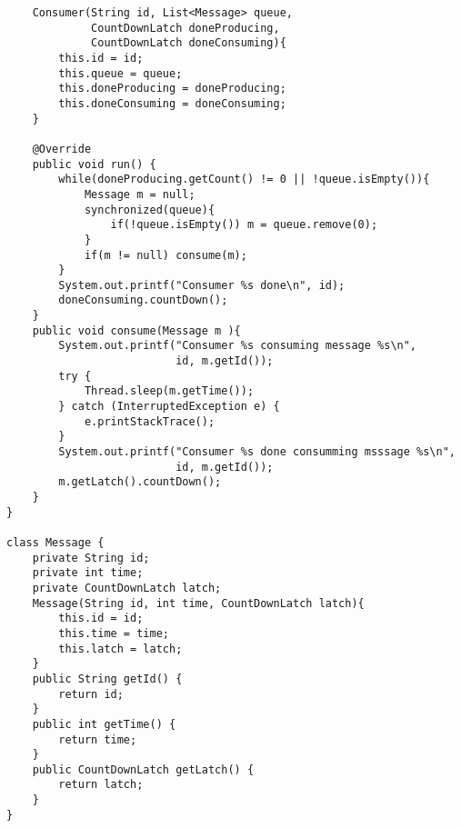 \documentclass{latex/classes/myarticle}
\begin{document}
\begin{lstlisting}
    Consumer(String id, List<Message> queue,
             CountDownLatch doneProducing,
             CountDownLatch doneConsuming){
        this.id = id;
        this.queue = queue;
        this.doneProducing = doneProducing;
        this.doneConsuming = doneConsuming;
    }

    @Override
    public void run() {
        while(doneProducing.getCount() != 0 || !queue.isEmpty()){
            Message m = null;
            synchronized(queue){
                if(!queue.isEmpty()) m = queue.remove(0);
            }
            if(m != null) consume(m);
        }
        System.out.printf("Consumer %s done\n", id);
        doneConsuming.countDown();
    }
    public void consume(Message m ){
        System.out.printf("Consumer %s consuming message %s\n",
                          id, m.getId());
        try {
            Thread.sleep(m.getTime());
        } catch (InterruptedException e) {
            e.printStackTrace();
        }
        System.out.printf("Consumer %s done consumming msssage %s\n",
                          id, m.getId());
        m.getLatch().countDown();
    }
}

class Message {
    private String id;
    private int time;
    private CountDownLatch latch;
    Message(String id, int time, CountDownLatch latch){
        this.id = id;
        this.time = time;
        this.latch = latch;
    }
    public String getId() {
        return id;
    }
    public int getTime() {
        return time;
    }
    public CountDownLatch getLatch() {
        return latch;
    }
}

\end{lstlisting}
\end{document}
